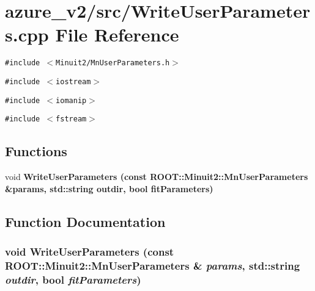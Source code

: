 \section{azure\_\-v2/src/Write\-User\-Parameters.cpp File Reference}
\label{WriteUserParameters_8cpp}
{\tt \#include $<$Minuit2/Mn\-User\-Parameters.h$>$}\par
{\tt \#include $<$iostream$>$}\par
{\tt \#include $<$iomanip$>$}\par
{\tt \#include $<$fstream$>$}\par
\subsection*{Functions}
\begin{CompactItemize}
\item 
void \bf{Write\-User\-Parameters} (const ROOT::Minuit2::Mn\-User\-Parameters \&params, std::string outdir, bool fit\-Parameters)
\end{CompactItemize}


\subsection{Function Documentation}
\subsubsection{\setlength{\rightskip}{0pt plus 5cm}void Write\-User\-Parameters (const ROOT::Minuit2::Mn\-User\-Parameters \& {\em params}, std::string {\em outdir}, bool {\em fit\-Parameters})}\label{WriteUserParameters_8cpp_ccc7405c56280aa8f54e75de24da7e78}


